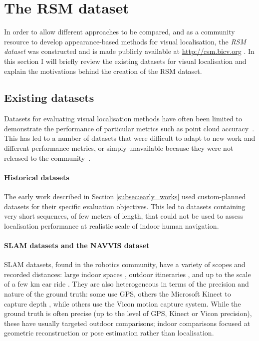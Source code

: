 \section{The RSM dataset}
\label{sec:Dataset}
In order to allow different approaches to be compared, and as a community resource to develop appearance-based methods for visual localisation, the \textit{RSM dataset} was constructed and is made publicly available at \url{http://rsm.bicv.org} \cite{Rivera-RubioRSM}. In this section I will briefly review the existing datasets for visual localisation and explain the motivations behind the creation of the RSM dataset.


\subsection{Existing datasets}

Datasets for evaluating visual localisation methods have often been limited to demonstrate the performance of particular metrics such as point cloud accuracy~\cite{Huitl2012, nardi2014introducing}. This has led to a number of datasets that were difficult to adapt to new work and different performance metrics, or simply unavailable because they were not released to the community~\cite{Matsumoto1996,Ohno1996,Tang2001}.

\paragraph{Historical datasets}

The early work described in Section \ref{subsec:early_works} used custom-planned datasets for their specific evaluation objectives. This led to datasets \cite{Matsumoto1996,Ohno1996,Tang2001} containing very short sequences, of few meters of length, that could not be used to assess localisation performance at realistic scale of indoor human navigation.

\paragraph{SLAM datasets and the NAVVIS dataset}

SLAM  da\-ta\-sets, found in the robotics community, have a variety of scopes and recorded distances: large indoor spaces \cite{sturm12iros}, outdoor i\-ti\-ne\-ra\-ries \cite{Bosse2004}, and up to the scale of a few km car ride \cite{Simpson2011}. They are also heterogeneous in terms of the precision and nature of the ground truth: some use GPS, others the Microsoft Kinect to capture depth \cite{sturm12iros}, while others use the Vicon motion capture system. While the ground truth is often precise (up to the level of GPS, Kinect or Vicon precision), these have usually targeted outdoor comparisons; indoor comparisons focused at geometric reconstruction or pose estimation rather than localisation.

